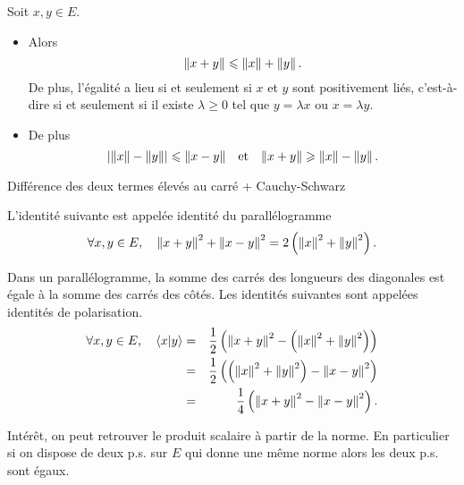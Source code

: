 \documentclass{magnolia}
\begin{document}
\begin{proposition}[utile=3, nom=Inégalité triangulaire]
Soit $x,y\in E$.
\begin{itemize}
\item Alors
  \[\left\|x+y\right\|\leqslant\left\|x\right\|+\left\|y\right\|.\]
  De plus, l'égalité a lieu si et seulement si $x$ et $y$ sont positivement
  liés, c'est-à-dire si et seulement si il existe $\lambda\geq 0$ tel que
  $y=\lambda x$ ou $x=\lambda y$.
\item De plus
  \[\left|\left\|x\right\|-\left\|y\right\|\right|\leqslant\left\|x-y\right\| \quad\!\text{et}\quad\!
    \left\|x+y\right\|\geqslant\left\|x\right\|-\left\|y\right\|.\]
\end{itemize}
\end{proposition}

\begin{preuve}
Différence des deux termes élevés au carré + Cauchy-Schwarz
\end{preuve}

\begin{proposition}[utile=2]
L'identité suivante est appelée identité du parallélogramme
\[\forall x,y\in E, \quad \left\|x+y\right\|^2+\left\|x-y\right\|^2=
  2\left(\left\|x\right\|^2+\left\|y\right\|^2\right).\]
\end{proposition}

\begin{remarques}
\remarque Dans un parallélogramme, la somme des carrés des longueurs des
  diagonales est égale à la somme des carrés des côtés.
\remarque Les identités suivantes sont appelées identités de polarisation.
  \begin{eqnarray*}
  \forall x,y\in E ,\quad \left\langle {x}\middle|{y}\right\rangle
  &=& \frac{1}{2}\left(\left\|x+y\right\|^2-\left(\left\|x\right\|^2+\left\|y\right\|^2\right)\right)\\
  &=& \frac{1}{2}\left(\left(\left\|x\right\|^2+\left\|y\right\|^2\right)-\left\|x-y\right\|^2\right)\\
  &=& \frac{1}{4}\left(\left\|x+y\right\|^2-\left\|x-y\right\|^2\right).
  \end{eqnarray*}
\end{remarques}
\begin{sol} Intérêt, on peut retrouver le produit scalaire à partir de la norme. En particulier si on dispose de deux p.s. sur $E$ qui donne une même norme alors les deux p.s. sont égaux.
\end{sol}
\end{document}
